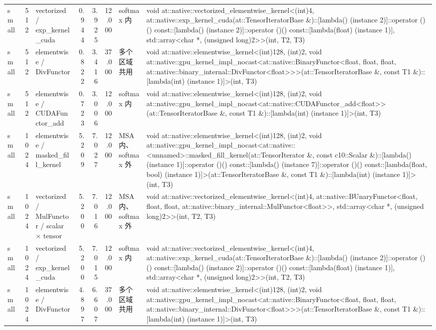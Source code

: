 \begin{tabular}{lrlrrrll}
small & 512 & vectorized / exp\_kernel\_cuda & 0.944 & 3.925 & 12.000 & softmax 内 & void at::native::vectorized\_elementwise\_kernel<(int)4, at::native::exp\_kernel\_cuda(at::TensorIteratorBase \&)::[lambda() (instance 2)]::operator ()() const::[lambda() (instance 2)]::operator ()() const::[lambda(float) (instance 1)], std::array<char *, (unsigned long)2>>(int, T2, T3) \\
small & 512 & elementwise / DivFunctor & 0.822 & 3.416 & 37.000 & 多个区域共用 & void at::native::elementwise\_kernel<(int)128, (int)2, void at::native::gpu\_kernel\_impl\_nocast<at::native::BinaryFunctor<float, float, float, at::native::binary\_internal::DivFunctor<float>>>(at::TensorIteratorBase \&, const T1 \&)::[lambda(int) (instance 1)]>(int, T3) \\
small & 512 & elementwise / CUDAFunctor\_add & 0.723 & 3.006 & 12.000 & softmax 内 & void at::native::elementwise\_kernel<(int)128, (int)2, void at::native::gpu\_kernel\_impl\_nocast<at::native::CUDAFunctor\_add<float>>(at::TensorIteratorBase \&, const T1 \&)::[lambda(int) (instance 1)]>(int, T3) \\
small & 1024 & elementwise / masked\_fill\_kernel & 5.209 & 7.027 & 12.000 & MSA 内、softmax 外 & void at::native::elementwise\_kernel<(int)128, (int)2, void at::native::gpu\_kernel\_impl\_nocast<at::native::<unnamed>::masked\_fill\_kernel(at::TensorIterator \&, const c10::Scalar \&)::[lambda() (instance 1)]::operator ()() const::[lambda() (instance 7)]::operator ()() const::[lambda(float, bool) (instance 1)]>(at::TensorIteratorBase \&, const T1 \&)::[lambda(int) (instance 1)]>(int, T3) \\
small & 1024 & vectorized / MulFunctor / scalar × tensor & 5.200 & 7.016 & 12.000 & MSA 内、softmax 外 & void at::native::vectorized\_elementwise\_kernel<(int)4, at::native::BUnaryFunctor<float, float, float, at::native::binary\_internal::MulFunctor<float>>, std::array<char *, (unsigned long)2>>(int, T2, T3) \\
small & 1024 & vectorized / exp\_kernel\_cuda & 5.200 & 7.015 & 12.000 & softmax 内 & void at::native::vectorized\_elementwise\_kernel<(int)4, at::native::exp\_kernel\_cuda(at::TensorIteratorBase \&)::[lambda() (instance 2)]::operator ()() const::[lambda() (instance 2)]::operator ()() const::[lambda(float) (instance 1)], std::array<char *, (unsigned long)2>>(int, T2, T3) \\
small & 1024 & elementwise / DivFunctor & 4.897 & 6.607 & 37.000 & 多个区域共用 & void at::native::elementwise\_kernel<(int)128, (int)2, void at::native::gpu\_kernel\_impl\_nocast<at::native::BinaryFunctor<float, float, float, at::native::binary\_internal::DivFunctor<float>>>(at::TensorIteratorBase \&, const T1 \&)::[lambda(int) (instance 1)]>(int, T3) \\

\end{tabular}
